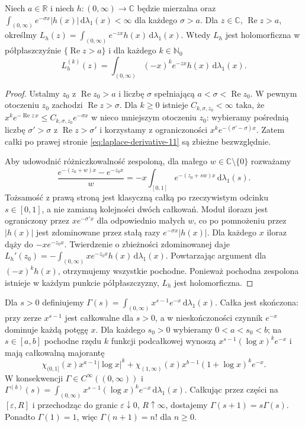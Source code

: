 \begin{twierdzenie}
\label{thm:laplace-holo-11}
Niech $a\in\mathbb R$ i niech $h:(0,\infty)\to\mathbb C$
będzie mierzalna oraz
$\int_{(0,\infty)}e^{-\sigma x}|h(x)|\,\mathrm d\lambda_1(x)<\infty$
dla każdego $\sigma>a$. Dla $z\in\mathbb C$,
$\operatorname{Re}z>a$, określmy
$L_h(z)=\int_{(0,\infty)}e^{-zx}h(x)\,\mathrm d\lambda_1(x)$.
Wtedy $L_h$ jest holomorficzna w półpłaszczyźnie
$\{\operatorname{Re}z>a\}$ i dla każdego $k\in\mathbb N_0$
\begin{equation}\label{eq:laplace-derivative-11}
L_h^{(k)}(z)=\int_{(0,\infty)}(-x)^k e^{-zx}h(x)
\,\mathrm d\lambda_1(x).
\end{equation}
\end{twierdzenie}
\begin{proof}
Ustalmy $z_0$ z $\operatorname{Re}z_0>a$ i liczbę
$\sigma$ spełniającą $a<\sigma<\operatorname{Re}z_0$.
W pewnym otoczeniu $z_0$ zachodzi $\operatorname{Re}z>\sigma$.
Dla $k\ge0$ istnieje $C_{k,\sigma,z_0}<\infty$ taka, że
$x^k e^{-\operatorname{Re}z\,x}\le
C_{k,\sigma,z_0}e^{-\sigma x}$ w nieco mniejszym
otoczeniu $z_0$: wybieramy pośrednią liczbę
$\sigma'>\sigma$ z $\operatorname{Re}z>\sigma'$
i korzystamy z ograniczoności $x^ke^{-(\sigma'-\sigma)x}$.
Zatem całki po prawej stronie
\eqref{eq:laplace-derivative-11} są zbieżne bezwzględnie.

Aby udowodnić różniczkowalność zespoloną, dla małego
$w\in\mathbb C\setminus\{0\}$ rozważamy
\[
\frac{e^{-(z_0+w)x}-e^{-z_0x}}{w}
=-x\int_{[0,1]}e^{-(z_0+sw)x}\,\mathrm d\lambda_1(s).
\]
Tożsamość z prawą stroną jest klasyczną
całką po rzeczywistym odcinku $s\in[0,1]$,
a nie zamianą kolejności dwóch całkowań.
Moduł ilorazu jest ograniczony przez
$x e^{-\sigma'x}$ dla odpowiednio małych $w$,
co po pomnożeniu przez $|h(x)|$ jest zdominowane
przez stałą razy $e^{-\sigma x}|h(x)|$.
Dla każdego $x$ iloraz dąży do $-xe^{-z_0x}$.
Twierdzenie o zbieżności zdominowanej daje
$L_h'(z_0)=-\int_{(0,\infty)}xe^{-z_0x}h(x)
\,\mathrm d\lambda_1(x)$. Powtarzając argument dla
$(-x)^kh(x)$, otrzymujemy wszystkie pochodne.
Ponieważ pochodna zespolona istnieje w każdym punkcie
półpłaszczyzny, $L_h$ jest holomorficzna.
\end{proof}

\begin{przyklad}
\label{ex:gamma-param-11}
Dla $s>0$ definiujemy
$\Gamma(s)=\int_{(0,\infty)}x^{s-1}e^{-x}\,\mathrm d\lambda_1(x)$.
Całka jest skończona: przy zerze $x^{s-1}$ jest
całkowalne dla $s>0$, a w nieskończoności czynnik
$e^{-x}$ dominuje każdą potęgę $x$.
Dla każdego $s_0>0$ wybieramy $0<a<s_0<b$;
na $s\in[a,b]$ pochodne rzędu $k$ funkcji podcałkowej
wynoszą $x^{s-1}(\log x)^k e^{-x}$ i mają całkowalną
majorantę
\[
\chi_{(0,1]}(x)x^{a-1}|\log x|^k
+\chi_{(1,\infty)}(x)x^{b-1}(1+\log x)^k e^{-x}.
\]
W konsekwencji $\Gamma\in C^\infty((0,\infty))$ i
$\Gamma^{(k)}(s)=\int_{(0,\infty)}
 x^{s-1}(\log x)^k e^{-x}\,\mathrm d\lambda_1(x)$.
Całkując przez części na $[\varepsilon,R]$ i przechodząc
do granic $\varepsilon\downarrow0$, $R\uparrow\infty$,
dostajemy $\Gamma(s+1)=s\Gamma(s)$.
Ponadto $\Gamma(1)=1$, więc $\Gamma(n+1)=n!$ dla $n\ge0$.
\end{przyklad}

